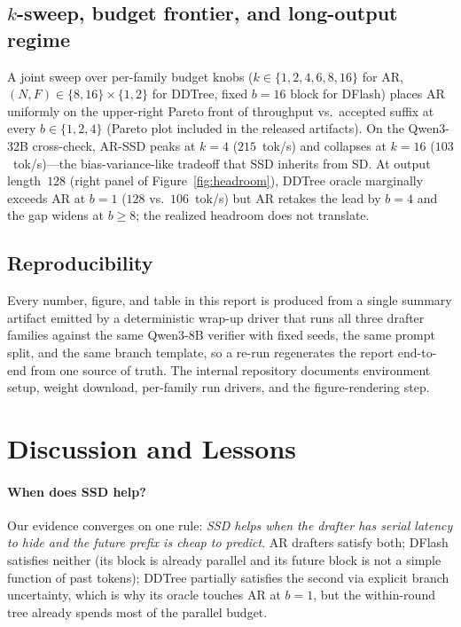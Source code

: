 \documentclass{article}
\begin{document}
\subsection{$k$-sweep, budget frontier, and long-output regime}
\label{ssec:extra}

A joint sweep over per-family budget knobs ($k\in\{1,2,4,6,8,16\}$ for AR, $(N,F)\in\{8,16\}\times\{1,2\}$ for DDTree, fixed $b{=}16$ block for DFlash) places AR uniformly on the upper-right Pareto front of throughput vs.\ accepted suffix at every $b\in\{1,2,4\}$ (Pareto plot included in the released artifacts).
On the Qwen3-32B cross-check, AR-SSD peaks at $k{=}4$ ($215$~tok/s) and collapses at $k{=}16$ ($103$~tok/s)---the bias-variance-like tradeoff that SSD inherits from SD.
At output length~$128$ (right panel of Figure~\ref{fig:headroom}), DDTree oracle marginally exceeds AR at $b{=}1$ ($128$ vs.\ $106$~tok/s) but AR retakes the lead by $b{=}4$ and the gap widens at $b{\ge}8$; the realized headroom does not translate.

\subsection{Reproducibility}
\label{ssec:repro}
Every number, figure, and table in this report is produced from a single summary artifact emitted by a deterministic wrap-up driver that runs all three drafter families against the same Qwen3-8B verifier with fixed seeds, the same prompt split, and the same branch template, so a re-run regenerates the report end-to-end from one source of truth.
The internal repository documents environment setup, weight download, per-family run drivers, and the figure-rendering step.

\section{Discussion and Lessons}
\label{sec:disc}

\paragraph{When does SSD help?}
Our evidence converges on one rule: \emph{SSD helps when the drafter has serial latency to hide and the future prefix is cheap to predict}.
AR drafters satisfy both; DFlash satisfies neither (its block is already parallel and its future block is not a simple function of past tokens); DDTree partially satisfies the second via explicit branch uncertainty, which is why its oracle touches AR at $b{=}1$, but the within-round tree already spends most of the parallel budget.
\end{document}
